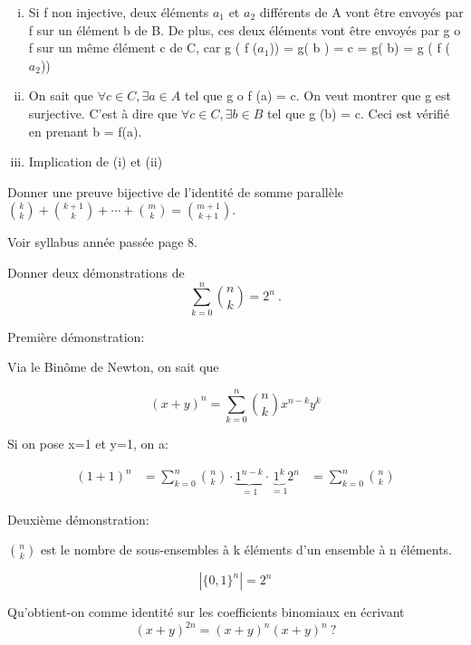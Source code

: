 \begin{enumerate}[(i)]
	\item Si f non injective, deux éléments $a_{1}$ et $a_{2}$ différents de A vont être envoyés par f sur un élément b de B. De plus, ces deux éléments vont être envoyés par g o f sur un même élément c de C, car g ( f ($a_1$)) = g( b ) = c = g( b) = g ( f ( $a_2$))
	\item On sait que $\forall c \in C , \exists a \in A$ tel que g o f (a) = c. 
		On veut montrer que g est surjective. C'est à dire que $\forall c \in C, \exists b \in B$ tel que g (b) = c. 
		Ceci est vérifié en prenant b = f(a).
	\item Implication de (i) et (ii)
\end{enumerate}


\begin{exo}
Donner une preuve bijective de l'identit\'e de somme parall\`ele ${k \choose k} + {k+1 \choose k} + \cdots + {m \choose k} = {m+1 \choose k+1}$.
\end{exo}

Voir syllabus année passée page 8.


\begin{exo}
Donner deux d\'emonstrations de
$$
\sum_{k=0}^n {n \choose k} = 2^n\ .
$$
\end{exo}

Première démonstration: 

Via le Binôme de Newton, on sait que

$$(x+y)^n = \sum_{k=0}^n {n \choose k} x^{n-k} y^k$$

Si on pose x=1 et y=1, on a: 

\begin{align*}
 (1+1)^n &= \sum_{k=0}^n {n \choose k} \cdot \underbrace{1^{n-k}}_{=1} \cdot \underbrace{1^k}_{=1} 
 2^n &= \sum_{k=0}^n {n \choose k}
\end{align*}

Deuxième démonstration: 

${n \choose k}$ est le nombre de sous-ensembles à k éléments d'un ensemble à n éléments. 

$$ |\{ 0,1 \}^n| = 2^n $$


\begin{exo}
Qu'obtient-on comme identit\'e sur les coefficients binomiaux en \'ecrivant
$$
(x+y)^{2n} = (x+y)^n(x+y)^n\ ?
$$
\end{exo}

